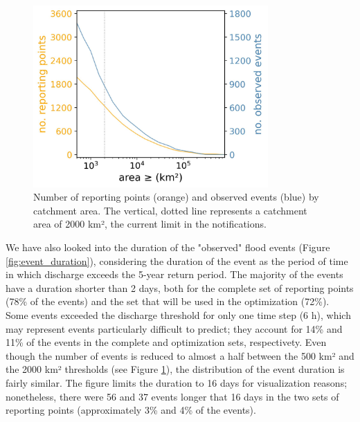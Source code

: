 \documentclass[preprint,12pt]{elsarticle}
\begin{document}
\begin{figure}
    \centering
    \includegraphics[width=0.8\textwidth]{figures/points_observedEvents_vs_area_2000km2_1239points.jpg}
    \caption{Number of reporting points (orange) and observed events (blue) by catchment area. The vertical, dotted line represents a catchment area of 2000 km², the current limit in the notifications.}
    \label{fig:observed_vs_area}
\end{figure}

We have also looked into the duration of the "observed" flood events (Figure \ref{fig:event_duration}), considering the duration of the event as the period of time in which discharge exceeds the 5-year return period. The majority of the events have a duration shorter than 2 days, both for the complete set of reporting points (78\% of the events) and the set that will be used in the optimization (72\%). Some events exceeded the discharge threshold for only one time step (6 h), which may represent events particularly difficult to predict; they account for 14\% and 11\% of the events in the complete and optimization sets, respectivety. Even though the number of events is reduced to almost a half between the 500 km² and the 2000 km² thresholds (see Figure \ref{fig:observed_vs_area}), the distribution of the event duration is fairly similar. The figure limits the duration to 16 days for visualization reasons; nonetheless, there were 56 and 37 events longer that 16 days in the two sets of reporting points (approximately 3\% and 4\% of the events).
\end{document}
